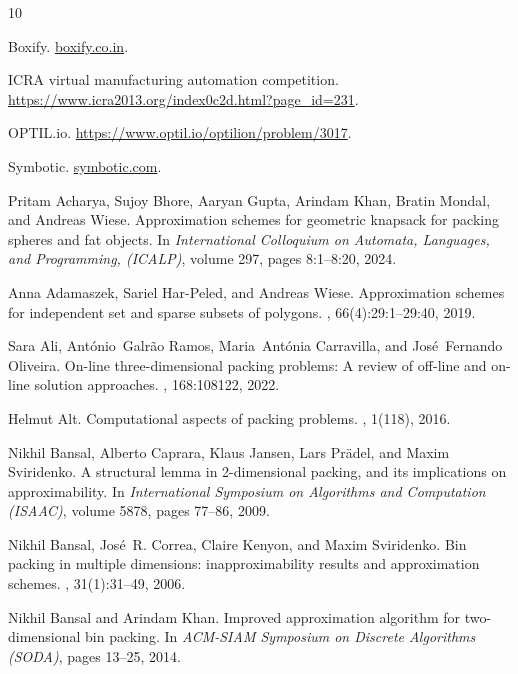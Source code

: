 \begin{thebibliography}{10}

Boxify.
\newblock \url{boxify.co.in}.

{ICRA} virtual manufacturing automation competition.
\newblock \url{https://www.icra2013.org/index0c2d.html?page_id=231}.

{OPTIL}.io.
\newblock \url{https://www.optil.io/optilion/problem/3017}.

Symbotic.
\newblock \url{symbotic.com}.

Pritam Acharya, Sujoy Bhore, Aaryan Gupta, Arindam Khan, Bratin Mondal, and
  Andreas Wiese.
\newblock Approximation schemes for geometric knapsack for packing spheres and
  fat objects.
\newblock In {\em International Colloquium on Automata, Languages, and
  Programming, (ICALP)}, volume 297, pages 8:1--8:20, 2024.

Anna Adamaszek, Sariel Har{-}Peled, and Andreas Wiese.
\newblock Approximation schemes for independent set and sparse subsets of
  polygons.
, 66(4):29:1--29:40, 2019.

Sara Ali, Ant{\'o}nio~Galr{\~a}o Ramos, Maria~Ant{\'o}nia Carravilla, and
  Jos{\'e}~Fernando Oliveira.
\newblock On-line three-dimensional packing problems: A review of off-line and
  on-line solution approaches.
, 168:108122, 2022.

Helmut Alt.
\newblock Computational aspects of packing problems.
, 1(118), 2016.

Nikhil Bansal, Alberto Caprara, Klaus Jansen, Lars Pr{\"{a}}del, and Maxim
  Sviridenko.
\newblock A structural lemma in 2-dimensional packing, and its implications on
  approximability.
\newblock In {\em International Symposium on Algorithms and Computation
  (ISAAC)}, volume 5878, pages 77--86, 2009.

Nikhil Bansal, Jos{\'e}~R. Correa, Claire Kenyon, and Maxim Sviridenko.
\newblock Bin packing in multiple dimensions: inapproximability results and
  approximation schemes.
, 31(1):31--49, 2006.

Nikhil Bansal and Arindam Khan.
\newblock Improved approximation algorithm for two-dimensional bin packing.
\newblock In {\em ACM-SIAM Symposium on Discrete Algorithms (SODA)}, pages
  13--25, 2014.


\end{thebibliography}
